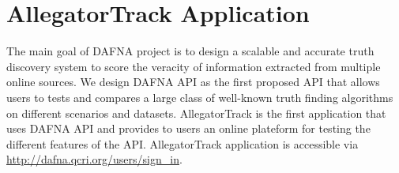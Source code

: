 \documentclass[a4paper,10pt]{scrartcl}
\begin{document}
\section{AllegatorTrack Application}
The main goal of DAFNA project is to design a scalable and accurate truth discovery system to score the veracity of information extracted from multiple 
online sources.  We design DAFNA API as the first proposed API that allows users to tests and compares a large class of well-known truth finding algorithms
on different scenarios and datasets. AllegatorTrack is the first application that uses DAFNA API and provides to users
an online plateform for testing the different features of the API. AllegatorTrack application is accessible via \href{http://dafna.qcri.org/users/sign\_in}{http://dafna.qcri.org/users/sign\_in}.
\end{document}
